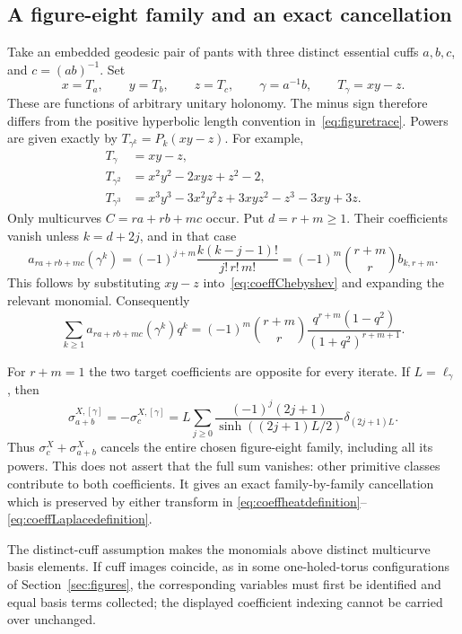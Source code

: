 \subsection{A figure-eight family and an exact cancellation}

Take an embedded geodesic pair of pants with three distinct essential
cuffs $a,b,c$, and $c=(ab)^{-1}$. Set
\[
 x=T_a,\qquad y=T_b,\qquad z=T_c,\qquad
 \gamma=a^{-1}b,
 \qquad T_\gamma=xy-z.
\]
These are functions of arbitrary unitary holonomy. The minus sign
therefore differs from the positive hyperbolic length convention
in~\eqref{eq:figuretrace}. Powers are given exactly by
$T_{\gamma^k}=P_k(xy-z)$. For example,
\begin{align*}
 T_\gamma&=xy-z,\\
 T_{\gamma^2}&=x^2y^2-2xyz+z^2-2,\\
 T_{\gamma^3}&=x^3y^3-3x^2y^2z+3xyz^2-z^3-3xy+3z.
\end{align*}
Only multicurves $C=ra+rb+mc$ occur. Put $d=r+m\geq1$.
Their coefficients vanish unless $k=d+2j$, and in that case
\begin{equation}
 \boxed{
 a_{ra+rb+mc}(\gamma^k)
 =(-1)^{j+m}\frac{k(k-j-1)!}{j!\,r!\,m!}
 =(-1)^m\binom{r+m}{r}b_{k,r+m}.
 }
 \label{eq:coefffigurepowers}
\end{equation}
This follows by substituting $xy-z$ into~\eqref{eq:coeffChebyshev}
and expanding the relevant monomial. Consequently
\[
 \sum_{k\geq1}a_{ra+rb+mc}(\gamma^k)q^k
 =(-1)^m\binom{r+m}{r}
 \frac{q^{r+m}(1-q^2)}{(1+q^2)^{r+m+1}}.
\]

For $r+m=1$ the two target coefficients are opposite for every
iterate. If $L=\ell_\gamma$, then
\begin{equation}
 \boxed{
 \sigma_{a+b}^{X,[\gamma]}
 =-\sigma_c^{X,[\gamma]}
 =L\sum_{j\geq0}
 \frac{(-1)^j(2j+1)}{\sinh((2j+1)L/2)}
 \delta_{(2j+1)L}.
 }
 \label{eq:coefffigurecancellation}
\end{equation}
Thus $\sigma_c^X+\sigma_{a+b}^X$ cancels the entire chosen
figure-eight family, including all its powers. This does not assert
that the full sum vanishes: other primitive classes contribute to
both coefficients. It gives an exact family-by-family cancellation
which is preserved by either transform in
\eqref{eq:coeffheatdefinition}--\eqref{eq:coeffLaplacedefinition}.

The distinct-cuff assumption makes the monomials above distinct
multicurve basis elements. If cuff images coincide, as in some
one-holed-torus configurations of Section~\ref{sec:figures}, the
corresponding variables must first be identified and equal basis
terms collected; the displayed coefficient indexing cannot be
carried over unchanged.

